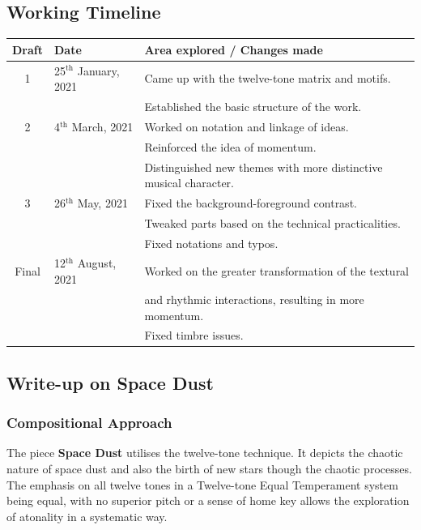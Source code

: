 \documentclass{article}
\begin{document}
\subsection{Working Timeline}
\begin{center}
	\def\arraystretch{1.5}
\begin{tabular}{|c|l|l|}
	\hline
	Draft&Date&Area explored / Changes made\\
	\hline
    1&25\(^\text{th}\) January, 2021&
    Came up with the twelve-tone matrix and motifs.\\
    &&Established the basic structure of the work.\\
	\hline
	2&4\(^\text{th}\) March, 2021&
    Worked on notation and linkage of ideas.\\
    && Reinforced the idea of momentum.\\
    && Distinguished new themes with more distinctive musical character.\\
	\hline
	3&26\(^\text{th}\) May, 2021&
    Fixed the background-foreground contrast.\\
    &&Tweaked parts based on the technical practicalities.\\
    &&Fixed notations and typos.\\
	\hline
	Final&12\(^\text{th}\) August, 2021&
    Worked on the greater transformation of the textural\\
    &&and rhythmic interactions, resulting in more momentum.\\
    &&Fixed timbre issues.\\
	\hline
\end{tabular}
\end{center}

\subsection{Write-up on {\bf Space Dust}}

\subsubsection{Compositional Approach}

The piece \textbf{Space Dust} utilises the twelve-tone technique. It depicts
the chaotic nature of space dust and also the birth of new stars though the
chaotic processes. The emphasis on all twelve tones in a Twelve-tone Equal
Temperament system being equal, with no superior pitch or a sense of home key
allows the exploration of atonality in a systematic way.\\
\end{document}
